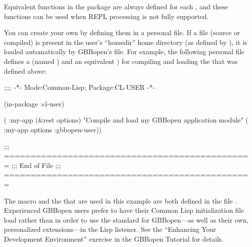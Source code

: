 \documentclass[10pt,twoside,english,pdftex]{article}
\begin{document}
Equivalent functions in the  package are always
defined for each , and these functions can be used when
REPL  processing is not fully supported.

%
%
%
%
%
%
You can create your own  by defining them in a personal
 file.  If a 
file (source or compiled) is present in the user's ``homedir'' home directory
(as defined by ), it is loaded
automatically by GBBopen's  file.  For example, the
following personal  file defines a
 (named ) and an equivalent
 ) for compiling and loading the
  that was defined above:
%
\W\supp\notpretop
\begin{example}
  ;;;; -*- Mode:Common-Lisp; Package:CL-USER -*-

  (in-package :cl-user)

  ( :my-app (&rest options)
    "Compile and load my GBBopen application module"
    ( :my-app options :gbbopen-user))

  ;;; ===============================================
  ;;;   End of File
  ;;; ===============================================
\end{example}

The macro  and the 
 that are used in this example are both defined
in the file .
Experienced GBBopen users prefer to have their Common Lisp initialization file
load  rather than
 in order to use the
standard  for GBBopen---as well as their own,
personalized extensions---in the Lisp listener.  See the ``Enhancing Your
Development Environment'' exercise in the GBBopen Tutorial for details.
\end{document}
